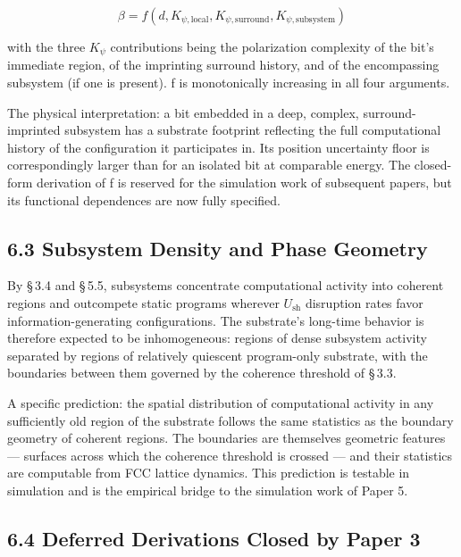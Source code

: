 \documentclass[11pt,oneside]{report}
\theoremstyle{definition}
\theoremstyle{remark}
\begin{document}
\begin{equation*}
\beta = f(d, K_{\psi,\mathrm{local}}, K_{\psi,\mathrm{surround}}, K_{\psi,\mathrm{subsystem}})
\end{equation*}

with the three \ensuremath{K_{\psi}} contributions being the polarization complexity of
the bit's immediate region, of the imprinting surround history, and of
the encompassing subsystem (if one is present). f is monotonically
increasing in all four arguments.

The physical interpretation: a bit embedded in a deep, complex,
surround-imprinted subsystem has a substrate footprint reflecting the
full computational history of the configuration it participates in. Its
position uncertainty floor is correspondingly larger than for an
isolated bit at comparable energy. The closed-form derivation of f is
reserved for the simulation work of subsequent papers, but its
functional dependences are now fully specified.

\subsection*{6.3 Subsystem Density and Phase Geometry}

By \S\,3.4 and \S\,5.5, subsystems concentrate computational activity into
coherent regions and outcompete static programs wherever \ensuremath{U_{\mathrm{sh}}} disruption
rates favor information-generating configurations. The substrate's
long-time behavior is therefore expected to be inhomogeneous: regions of
dense subsystem activity separated by regions of relatively quiescent
program-only substrate, with the boundaries between them governed by the
coherence threshold of \S\,3.3.

A specific prediction: the spatial distribution of computational
activity in any sufficiently old region of the substrate follows the
same statistics as the boundary geometry of coherent regions. The
boundaries are themselves geometric features --- surfaces across which
the coherence threshold is crossed --- and their statistics are
computable from FCC lattice dynamics. This prediction is testable in
simulation and is the empirical bridge to the simulation work of Paper
5.

\subsection*{6.4 Deferred Derivations Closed by Paper 3}
\end{document}
